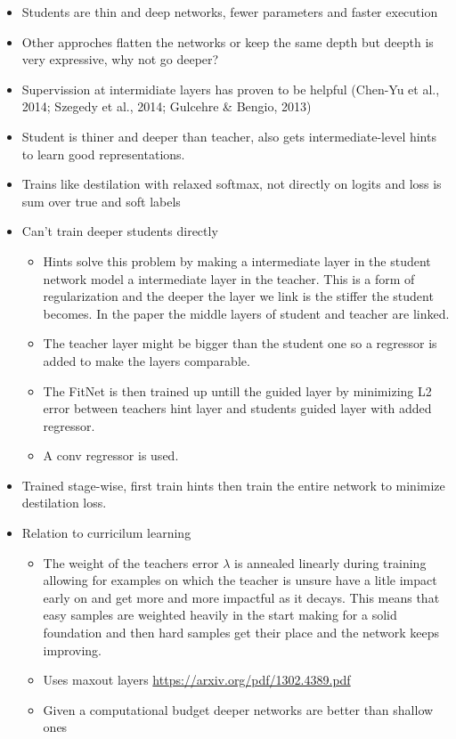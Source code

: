\documentclass[11pt]{article}
\begin{document}
\begin{itemize}
\item Students are thin and deep networks, fewer parameters and faster execution
\item Other approches flatten the networks or keep the same depth but deepth is very expressive, why not go deeper?
\item Supervission at intermidiate layers has proven to be helpful (Chen-Yu et al., 2014; Szegedy et al., 2014; Gulcehre \& Bengio, 2013)
\item Student is thiner and deeper than teacher, also gets intermediate-level hints to learn good representations.
\item Trains like destilation with relaxed softmax, not directly on logits and loss is sum over true and soft labels
\item Can't train deeper students directly
\begin{itemize}
\item Hints solve this problem by making a intermediate layer in the student network model a intermediate layer in the teacher. This is a form of regularization and the deeper the layer we link is the stiffer the student becomes. In the paper the middle layers of student and teacher are linked.
\item The teacher layer might be bigger than the student one so a regressor is added to make the layers comparable.
\item The FitNet is then trained up untill the guided layer by minimizing L2 error between teachers hint layer and students guided layer with added regressor.
\item A conv regressor is used.
\end{itemize}
\item Trained stage-wise, first train hints then train the entire network to minimize destilation loss.
\item Relation to curricilum learning
\begin{itemize}
\item The weight of the teachers error \(\lambda\) is annealed linearly during training allowing for examples on which the teacher is unsure have a litle impact early on and get more and more impactful as it decays. This means that easy samples are weighted heavily in the start making for a solid foundation and then hard samples get their place and the network keeps improving.
\item Uses maxout layers \url{https://arxiv.org/pdf/1302.4389.pdf}
\item Given a computational budget deeper networks are better than shallow ones
\end{itemize}
\end{itemize}
\end{document}

